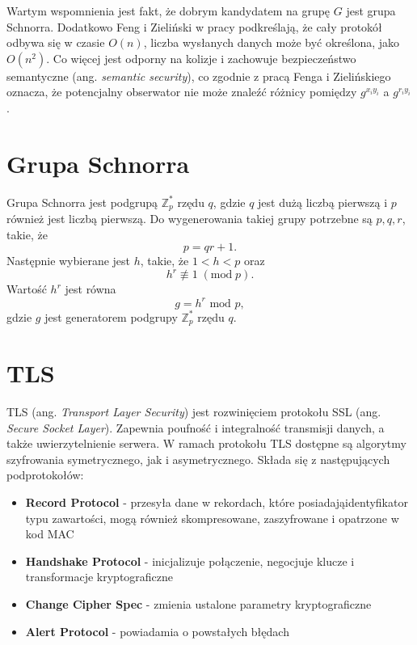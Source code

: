 \documentclass[a4paper]{article}
\begin{document}
Wartym wspomnienia jest fakt, że dobrym kandydatem na grupę $G$ jest grupa Schnorra. Dodatkowo Feng i Zieliński w pracy \cite{avNetwork} podkreślają, że cały protokół odbywa się w czasie $O(n)$, liczba wysłanych danych może być określona, jako $O(n^2)$. Co więcej jest odporny na kolizje i zachowuje bezpieczeństwo semantyczne (ang. \textit{semantic security}), co zgodnie z pracą Fenga i Zielińskiego oznacza, że potencjalny obserwator nie może znaleźć różnicy pomiędzy $g^{x_i y_i}$ a $g^{r_i y_i}$.

\section{Grupa Schnorra} \label{schnorrGroup}
Grupa Schnorra jest podgrupą $\mathbb{Z}^*_p$ rzędu $q$, gdzie $q$ jest dużą liczbą pierwszą i $p$ również jest liczbą pierwszą. Do wygenerowania takiej grupy potrzebne są $p, q, r$, takie, że 
\begin{equation}
    p=qr+1.
\end{equation}
Następnie wybierane jest $h$, takie, że $1 < h < p$ oraz
\begin{equation}
    h^{r}\not \equiv 1\;({\text{mod}}\;p).
\end{equation}
Wartość $h^r$ jest równa 
\begin{equation}
    g=h^{r}{\text{ mod }}p,
\end{equation}
gdzie $g$ jest generatorem podgrupy $\mathbb{Z}^*_p$ rzędu $q$.

\section{TLS}
TLS (ang. \textit{Transport Layer Security}) jest rozwinięciem protokołu SSL (ang. \textit{Secure Socket Layer}). Zapewnia poufność i integralność transmisji danych, a także uwierzytelnienie serwera. W ramach protokołu TLS dostępne są algorytmy szyfrowania symetrycznego, jak i asymetrycznego. Składa się z następujących podprotokołów:
\begin{itemize}
    \item \textbf{Record Protocol} - przesyła dane w rekordach, które posiadająidentyfikator typu zawartości, mogą również skompresowane, zaszyfrowane i opatrzone w kod MAC
    \item \textbf{Handshake Protocol} - inicjalizuje połączenie, negocjuje klucze i transformacje kryptograficzne
    \item \textbf{Change Cipher Spec} - zmienia ustalone parametry kryptograficzne
    \item \textbf{Alert Protocol} - powiadamia o powstałych błędach
\end{itemize}
\end{document}
